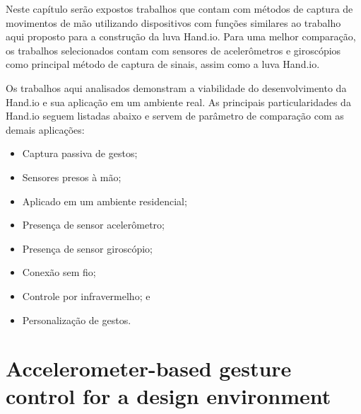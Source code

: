 Neste capítulo serão expostos trabalhos que contam com métodos de captura de movimentos de mão utilizando dispositivos com funções similares ao trabalho aqui proposto para a construção da luva Hand.io. Para uma melhor comparação, os trabalhos selecionados contam com sensores de acelerômetros e giroscópios como principal método de captura de sinais, assim como a luva Hand.io. 


Os trabalhos aqui analisados demonstram a viabilidade do desenvolvimento da Hand.io e sua aplicação em um ambiente real. As principais particularidades da Hand.io seguem listadas abaixo e servem de parâmetro de comparação com as demais aplicações:
\begin{itemize}
    \item Captura passiva de gestos;
    \item Sensores presos à mão;
    \item Aplicado em um ambiente residencial;
    \item Presença de sensor acelerômetro;
    \item Presença de sensor giroscópio;
    \item Conexão sem fio;
    \item Controle por infravermelho; e
    \item Personalização de gestos.
\end{itemize}


\section{Accelerometer-based gesture control for a design environment}


